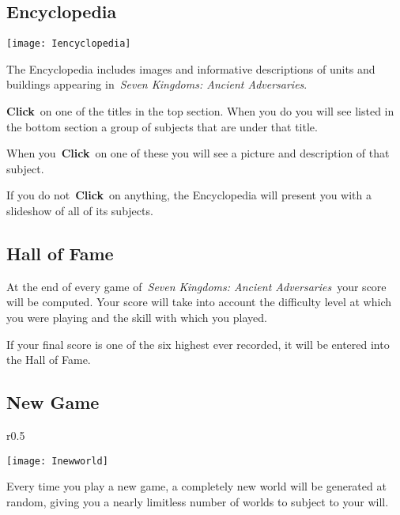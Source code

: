 \subsection{Encyclopedia}


\begin{center}
	\texttt{[image: Iencyclopedia]}
\end{center}

The Encyclopedia includes images and informative descriptions of units and buildings appearing in \textit{Seven Kingdoms: Ancient Adversaries}.

\textbf{Click} on one of the titles in the top section. When you do you will see listed in the bottom section a group of subjects that are under that title.

When you \textbf{Click} on one of these you will see a picture and description of that subject.

If you do not \textbf{Click} on anything, the Encyclopedia will present you with a slideshow of all of its subjects.

\subsection{Hall of Fame}

At the end of every game of \textit{Seven Kingdoms: Ancient Adversaries} your score will be computed. Your score will take into account the difficulty level at which you were playing and the skill with which you played.

If your final score is one of the six highest ever recorded, it will be entered into the Hall of Fame.

\subsection{New Game}

\begin{wrapfigure}{r}{0.5\textwidth}
	\begin{center}
		\vspace{-20pt}
		\texttt{[image: Inewworld]}
	\end{center}
\vspace{-20pt}
\end{wrapfigure}

Every time you play a new game, a completely new world will be generated at random, giving you a nearly limitless number of worlds to subject to your will.

